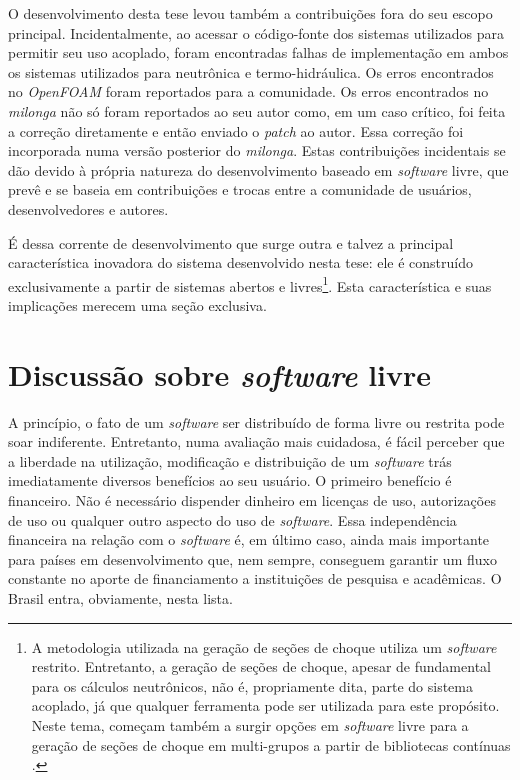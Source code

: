 O desenvolvimento desta tese levou também a contribuições fora do seu escopo principal.
Incidentalmente, ao acessar o código-fonte dos sistemas utilizados para permitir seu
uso acoplado, foram encontradas
falhas de implementação em ambos os sistemas utilizados para neutrônica e termo-hidráulica.
Os erros encontrados no \textit{OpenFOAM} foram reportados para a comunidade.
Os erros encontrados no \textit{milonga} não só foram reportados ao seu autor como,
em um caso crítico, foi feita a correção diretamente e então enviado o \textit{patch} ao autor.
Essa correção foi incorporada numa versão posterior do \textit{milonga}.
Estas contribuições incidentais se dão devido à própria natureza do desenvolvimento baseado
em \textit{software} livre, que prevê e se baseia em contribuições e trocas entre a comunidade
de usuários, desenvolvedores e autores.

É dessa corrente de desenvolvimento que surge outra e talvez a principal característica inovadora
do sistema desenvolvido nesta tese: ele é construído exclusivamente a partir
de sistemas abertos e livres\footnote{A metodologia utilizada
  na geração de seções de choque utiliza um \textit{software} restrito. Entretanto, a geração
  de seções de choque, apesar de fundamental para os cálculos neutrônicos, não é, propriamente dita,
  parte do sistema acoplado, já que qualquer ferramenta pode ser utilizada para este propósito. Neste tema, começam também a surgir opções em \textit{software} livre
  para a geração de seções de choque em multi-grupos a partir de bibliotecas contínuas \cite{Slaybaugh2014}.}.
Esta característica e suas implicações merecem uma seção exclusiva.


\section{Discussão sobre \textit{software} livre}

A princípio, o fato de um \textit{software} ser distribuído de forma livre ou restrita pode soar indiferente.
Entretanto, numa avaliação mais cuidadosa, é fácil
perceber que a liberdade na utilização, modificação e distribuição de um \textit{software} trás imediatamente
diversos benefícios ao seu usuário. O primeiro
benefício é financeiro. Não é necessário dispender dinheiro em licenças de uso, autorizações de uso ou
qualquer outro aspecto do uso de \textit{software}. Essa independência financeira na relação com o \textit{software} é, em último caso,
ainda mais importante para países em desenvolvimento que, nem sempre, conseguem garantir um fluxo constante
no aporte de financiamento a instituições de pesquisa e acadêmicas. O Brasil entra, obviamente, nesta lista.

